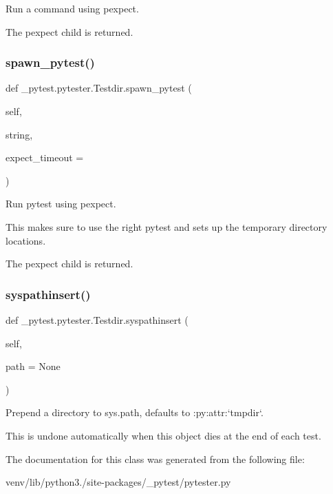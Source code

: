 \begin{DoxyVerb}Run a command using pexpect.

The pexpect child is returned.\end{DoxyVerb}
 \mbox{\label{class__pytest_1_1pytester_1_1_testdir_adb5e39574c3a4cbd3b600e758097f7e0}} 
\subsubsection{\texorpdfstring{spawn\+\_\+pytest()}{spawn\_pytest()}}
{\footnotesize\ttfamily def \+\_\+pytest.\+pytester.\+Testdir.\+spawn\+\_\+pytest (\begin{DoxyParamCaption}\item[{}]{self,  }\item[{}]{string,  }\item[{}]{expect\+\_\+timeout = {} }\end{DoxyParamCaption})}

\begin{DoxyVerb}Run pytest using pexpect.

This makes sure to use the right pytest and sets up the temporary
directory locations.

The pexpect child is returned.\end{DoxyVerb}
 \mbox{\label{class__pytest_1_1pytester_1_1_testdir_a9437e10415a1ca4b4fe29673915068bf}} 
\subsubsection{\texorpdfstring{syspathinsert()}{syspathinsert()}}
{\footnotesize\ttfamily def \+\_\+pytest.\+pytester.\+Testdir.\+syspathinsert (\begin{DoxyParamCaption}\item[{}]{self,  }\item[{}]{path = {\ttfamily None} }\end{DoxyParamCaption})}

\begin{DoxyVerb}Prepend a directory to sys.path, defaults to :py:attr:`tmpdir`.

This is undone automatically when this object dies at the end of each
test.\end{DoxyVerb}
 

The documentation for this class was generated from the following file\+:\begin{DoxyCompactItemize}
\item 
venv/lib/python3./site-\/packages/\+\_\+pytest/pytester.\+py\end{DoxyCompactItemize}
